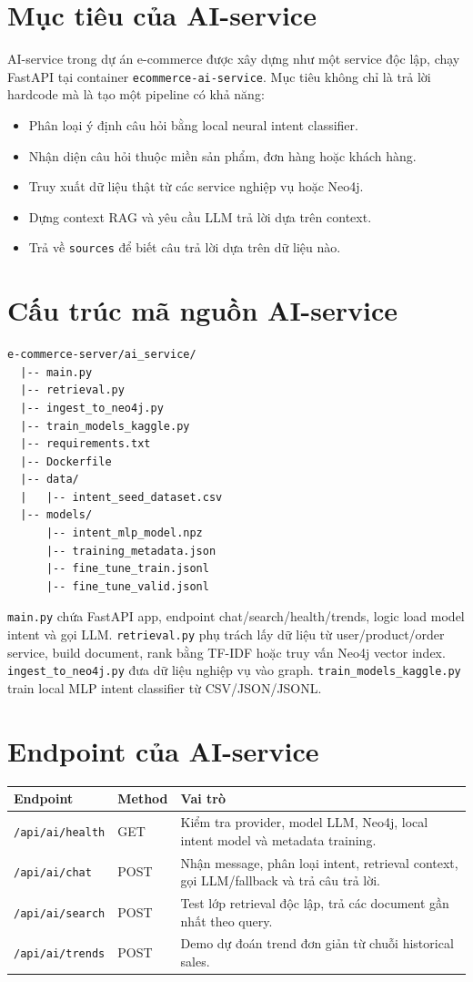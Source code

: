 \documentclass[12pt,a4paper]{report}
\begin{document}
\section{Mục tiêu của AI-service}
AI-service trong dự án e-commerce được xây dựng như một service độc lập, chạy FastAPI tại container \texttt{ecommerce-ai-service}. Mục tiêu không chỉ là trả lời hardcode mà là tạo một pipeline có khả năng:
\begin{itemize}
  \item Phân loại ý định câu hỏi bằng local neural intent classifier.
  \item Nhận diện câu hỏi thuộc miền sản phẩm, đơn hàng hoặc khách hàng.
  \item Truy xuất dữ liệu thật từ các service nghiệp vụ hoặc Neo4j.
  \item Dựng context RAG và yêu cầu LLM trả lời dựa trên context.
  \item Trả về \texttt{sources} để biết câu trả lời dựa trên dữ liệu nào.
\end{itemize}

\section{Cấu trúc mã nguồn AI-service}
\begin{lstlisting}[style=code,caption={Cấu trúc chính của ai_service}]
e-commerce-server/ai_service/
  |-- main.py
  |-- retrieval.py
  |-- ingest_to_neo4j.py
  |-- train_models_kaggle.py
  |-- requirements.txt
  |-- Dockerfile
  |-- data/
  |   |-- intent_seed_dataset.csv
  |-- models/
      |-- intent_mlp_model.npz
      |-- training_metadata.json
      |-- fine_tune_train.jsonl
      |-- fine_tune_valid.jsonl
\end{lstlisting}

\texttt{main.py} chứa FastAPI app, endpoint chat/search/health/trends, logic load model intent và gọi LLM. \texttt{retrieval.py} phụ trách lấy dữ liệu từ user/product/order service, build document, rank bằng TF-IDF hoặc truy vấn Neo4j vector index. \texttt{ingest\_to\_neo4j.py} đưa dữ liệu nghiệp vụ vào graph. \texttt{train\_models\_kaggle.py} train local MLP intent classifier từ CSV/JSON/JSONL.

\section{Endpoint của AI-service}
\begin{longtable}{p{3.2cm}p{3cm}p{7cm}}
\toprule
\textbf{Endpoint} & \textbf{Method} & \textbf{Vai trò} \\
\midrule
\texttt{/api/ai/health} & GET & Kiểm tra provider, model LLM, Neo4j, local intent model và metadata training. \\
\texttt{/api/ai/chat} & POST & Nhận message, phân loại intent, retrieval context, gọi LLM/fallback và trả câu trả lời. \\
\texttt{/api/ai/search} & POST & Test lớp retrieval độc lập, trả các document gần nhất theo query. \\
\texttt{/api/ai/trends} & POST & Demo dự đoán trend đơn giản từ chuỗi historical sales. \\
\bottomrule
\end{longtable}
\end{document}

